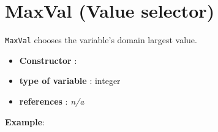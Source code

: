 \section{MaxVal (Value selector)}\label{maxval:maxvalvalselector}\hypertarget{maxval:maxvalvalselector}{}
\begin{notedef}
  \texttt{MaxVal} chooses the variable's domain largest value.
\end{notedef}

\begin{itemize}
	\item \textbf{Constructor} : 
	\item \textbf{type of variable} : integer
	\item \textbf{references} : \emph{n/a}
\end{itemize}

\textbf{Example}:
%

